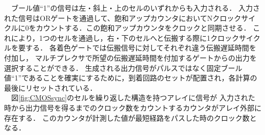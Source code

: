 \begin{itemize}
\begin{figure}[t!]
\end{figure}
\ \ ブール値“1”の信号は左・斜上・上のセルのいずれからも入力される．
入力された信号はORゲートを通過して、飽和アップカウンタにおいてNクロックサイクルに0をカウントする．この飽和アップカウンタをクロックと同期させる．
これにより，1つのセルを通過し，右・下のセルへと伝搬する際に1クロックサイクルを要する．
各着色ゲートでは伝搬信号に対してそれぞれ違う伝搬遅延時間を付加し，
マルチプレクサで所望の伝搬遅延時間を付加するゲートからの出力を選択することができる．
生成される出力信号がパルスではなく固定ブール値“1”であることを確実にするために，到着回路のセットが配置され，各計算の最後にリセットされている．\\
\ \ 図\ref{fig:CMOSsync}のセルを繰り返した構造を持つアレイに信号が
入力された時から出力信号を得るまでのクロック数をカウントするカウンタがアレイ外部に存在する．
このカウンタが計測した値が最短経路をパスした時のクロック数となる．


\end{itemize}

